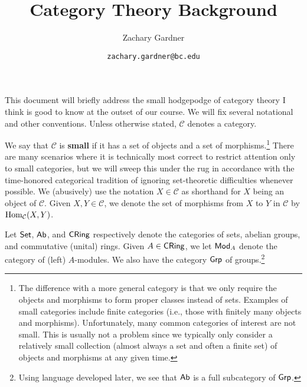 \documentclass[11pt]{article}
\renewcommand{\C}{\mathcal{C}}
\begin{document}
\title{Category Theory Background}
\author{Zachary Gardner}
\date{\texttt{zachary.gardner@bc.edu}}
\maketitle

This document will briefly address the small hodgepodge of category theory I think is good to know at the outset of our course. We will fix several notational and other conventions. Unless otherwise stated, $\C$ denotes a category.

We say that $\C$ is \textbf{small} if it has a set of objects and a set of morphisms.\footnote{The difference with a more general category is that we only require the objects and morphisms to form proper classes instead of sets. Examples of small categories include finite categories (i.e., those with finitely many objects and morphisms). Unfortunately, many common categories of interest are not small. This is usually not a problem since we typically only consider a relatively small collection (almost always a set and often a finite set) of objects and morphisms at any given time.} There are many scenarios where it is technically most correct to restrict attention only to small categories, but we will sweep this under the rug in accordance with the time-honored categorical tradition of ignoring set-theoretic difficulties whenever possible. We (abusively) use the notation $X\in\C$ as shorthand for $X$ being an object of $\C$. Given $X,Y\in\C$, we denote the set of morphisms from $X$ to $Y$ in $\C$ by $\Hom_{\C}(X,Y)$. 

\begin{example}
Let $\operatorname{\mathsf{Set}}$, $\operatorname{\mathsf{Ab}}$, and $\operatorname{\mathsf{CRing}}$ respectively denote the categories of sets, abelian groups, and commutative (unital) rings. Given $A\in\operatorname{\mathsf{CRing}}$, we let $\operatorname{\mathsf{Mod}}_A$ denote the category of (left) $A$-modules. We also have the category $\operatorname{\mathsf{Grp}}$ of groups.\footnote{Using language developed later, we see that $\operatorname{\mathsf{Ab}}$ is a full subcategory of $\operatorname{\mathsf{Grp}}$.}
\end{example}
\end{document}
